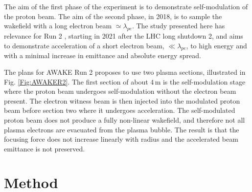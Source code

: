 \documentclass[aps,prstab,reprint,amsmath,amssymb,groupedaddress]{revtex4-1}
\newcommand{\unit}[1]{\,\mathrm{#1}}
\begin{document}
The aim of the first phase of the experiment is to demonstrate self-modulation of the proton beam. The aim of the second
phase, in 2018, is to sample the wakefield with a long electron beam $\simeq\lambda_{pe}$. The study presented here has
relevance for Run 2 \cite{adli:2016}, starting in 2021 after the LHC long shutdown 2, and aims to demonstrate
acceleration of a short electron beam, $\ll\lambda_{pe}$, to high energy and with a minimal increase in emittance and
absolute energy spread.

The plans for AWAKE Run 2 proposes to use two plasma sections, illustrated in Fig. \ref{Fig:AWAKER2}. The first
section of about $4\unit{m}$ is the self-modulation stage where the proton beam undergoes self-modulation without the
electron beam present. The electron witness beam is then injected into the modulated proton beam before section two
where it undergoes acceleration. The self-modulated proton beam does not produce a fully non-linear wakefield, and
therefore not all plasma electrons are evacuated from the plasma bubble. The result is that the focusing force does not
increase linearly with radius and the accelerated beam emittance is not preserved. 




\section[\label{S:M}]{Method}
\end{document}
